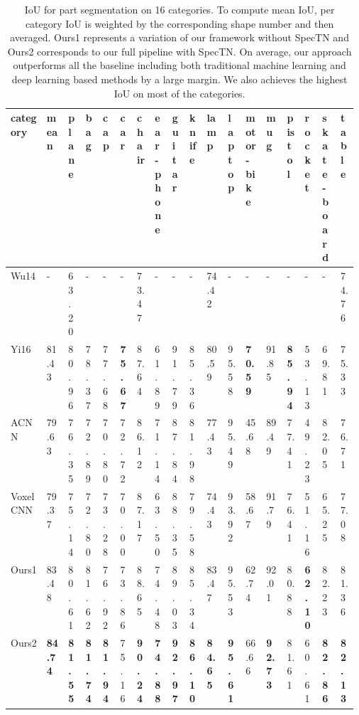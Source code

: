 \begin{table}[t!]
\centering
\small
\begin{tabular}{@{}p{0.09\linewidth}|p{0.04\linewidth}|p{0.025\linewidth}p{0.025\linewidth}p{0.025\linewidth}p{0.025\linewidth}p{0.03\linewidth}p{0.025\linewidth}p{0.025\linewidth}p{0.025\linewidth}p{0.03\linewidth}p{0.03\linewidth}p{0.025\linewidth}p{0.03\linewidth}p{0.03\linewidth}p{0.03\linewidth}p{0.03\linewidth}p{0.03\linewidth}}
\hline
category & mean & plane & bag & cap & car & chair & ear-phone & guitar & knife & lamp & laptop & motor-bike & mug & pistol & rocket & skate-board & table \\ \hline
Wu14 \cite{wu2014interactive} & - & 63.20 & - & - & - & 73.47 & - & - & - & 74.42 & - & - & - & - & - & - & 74.76 \\
Yi16 \cite{Yi16} & 81.43 & 80.96 & 78.37 & 77.68 & \textbf{75.67} & 87.64 & 61.89 & 91.79 & 85.36 & 80.59 & 95.58 & \textbf{70.59} & 91.85 & \textbf{85.94} & 53.13 & 69.81 & 75.33 \\
ACNN \cite{boscaini2016learning} & 79.63 & 76.35 & 72.89 & 70.80 & 72.72 & 86.12 & 71.14 & 87.84 & 81.98 & 77.43 & 95.49 & 45.68 & 89.49 & 77.41 & 49.23 & 82.05 & 76.71 \\
Voxel CNN & 79.37 & 75.14 & 72.80 & 73.28 & 70.00 & 87.17 & 63.50 & 88.35 & 79.58 & 74.43 & 93.92 & 58.67 & 91.79 & 76.41 & 51.16 & 65.25 & 77.08   \\ \hline
Ours1 & 83.48 & 80.61 & 81.62 & 76.92 & 73.86 & 88.65 & 74.48 & 89.03 & 85.34 & 83.47 & 95.53 & 62.74 & 92.01 & 80.88 & \textbf{62.10} & 82.23 & 81.36 \\
Ours2 & \textbf{84.74} & \textbf{81.55} & \textbf{81.74} & \textbf{81.94} & 75.16 & \textbf{90.24} & \textbf{74.88} & \textbf{92.97} & \textbf{86.10} & \textbf{84.65} & \textbf{95.61} & 66.66 & \textbf{92.73} & 81.61 & 60.61 & \textbf{82.86} & \textbf{82.13} \\ \hline
\end{tabular}
\caption{IoU for part segmentation on 16 categories. To compute mean IoU, per category IoU is weighted by the corresponding shape number and then averaged. Ours1 represents a variation of our framework without SpecTN and Ours2 corresponds to our full pipeline with SpecTN. On average, our approach outperforms all the baseline including both traditional machine learning and deep learning based methods by a large margin. We also achieves the highest IoU on most of the categories.}
\label{tab:percatseg}
\end{table}
\label{sec:exp}
